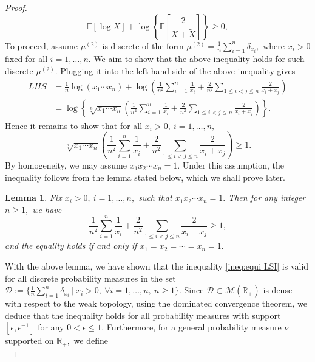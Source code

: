 \documentclass[10pt, reqno]{amsart}
\numberwithin{equation}{section}
\theoremstyle{definition}
\theoremstyle{plain}
\newtheorem{lemma}[definition]{Lemma}
\theoremstyle{remark}
\newcommand{\R}{\mathbb{R}}
\newcommand{\E}{\mathbb{E}}
\newcommand{\1}{\mathbbm{1}}
\begin{document}
\begin{proof}
\begin{equation*}
			\E[\log X]+\log\left\{ \E\left[ \frac{2}{X+\tilde{X}} \right] \right\}\geq 0,
		\end{equation*}
	    To proceed, assume $\mu^{(2)} $ is discrete of the form $\mu^{(2)} =\frac{1}{n}\sum_{i=1}^n\delta_{x_i},$ where $x_i>0$ fixed for all $i=1,\ldots, n.$ We aim to show that the above inequality holds for such discrete $\mu^{(2)}$. Plugging it into the left hand side of the above inequality gives
	    \begin{align*}
			LHS &= \frac{1}{n}\log (x_1\cdots x_n) + \log\left(\frac{1}{n^2} \sum_{i=1}^n  \frac{1}{x_i} + \frac{2}{n^2} \sum_{1\leq i<j\leq n}  \frac{2}{x_i+x_j} \right)\\
			&=\log\left\{ \sqrt[n]{x_1\cdots x_n}\left( \frac{1}{n^2} \sum_{i=1}^n  \frac{1}{x_i} + \frac{2}{n^2} \sum_{1\leq i<j\leq n}  \frac{2}{x_i+x_j}  \right) \right\}.
		\end{align*}
	    Hence it remains to show that for all $x_i>0,\ i=1,\ldots,n,$
	    \begin{equation*}
			\sqrt[n]{x_1\cdots x_n}\left( \frac{1}{n^2} \sum_{i=1}^n  \frac{1}{x_i} + \frac{2}{n^2} \sum_{1\leq i<j\leq n}   \frac{2}{x_i+x_j}  \right) \geq 1.
		\end{equation*}
	    By homogeneity, we may assume $x_1x_2\cdots x_n=1$. Under this assumption, the inequality follows from the lemma stated below, which we shall prove later.
	    \begin{lemma}\label{lem:discrete}
			Fix $x_i>0,\ i=1,\ldots,n,$ such that $x_1x_2\cdots x_n=1.$ Then for any integer $n\geq 1,$ we have
			\begin{equation*}
			   \frac{1}{n^2} \sum_{i=1}^n  \frac{1}{x_i} + \frac{2}{n^2} \sum_{1\leq i<j\leq n}  \frac{2}{x_i+x_j} \geq 1,
		\end{equation*}
	    and the equality holds if and only if $x_1=x_2=\cdots =x_n=1.$
		\end{lemma}
		With the above lemma, we have shown that the inequality \eqref{ineq:equi LSI} is valid for all discrete probability measures in the set $\mathcal{D}:=\{\frac{1}{n}\sum_{i=1}^n\delta_{x_i}\ \vert\ x_i>0,\ \forall i=1,\ldots,n,\ n\geq 1\}.$  Since $\mathcal{D}\subset \mathcal{M}(\R_+)$ is dense with respect to the weak topology, using the dominated convergence theorem, we deduce that the inequality holds for all probability measures with support $[\epsilon, \epsilon^{-1}]$ for any $0<\epsilon\leq 1.$ Furthermore, for a general probability measure $\nu $ supported on $\R_+,$ we define
		\begin{equation*}

\end{equation*}
\end{proof}
\end{document}
